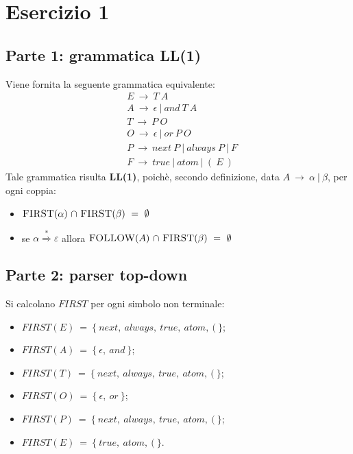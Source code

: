 \documentclass[a4paper,italian]{article}
\begin{document}

\setcounter{page}{1}
\section*{Esercizio 1}
\subsection*{Parte 1: grammatica LL(1)}
Viene fornita la seguente grammatica equivalente:
\begin{equation*}
	\begin{split}
		& E\ \rightarrow\ T\ A\\
		& A\ \rightarrow\ \epsilon\ \vert\ and\ T\ A\\
		& T\ \rightarrow\ P\ O \\
		& O\ \rightarrow\ \epsilon\ \vert\ or\ P\ O\\
		& P\ \rightarrow\ next\ P\ \vert\ always\ P\ \vert\ F\\
		& F\ \rightarrow\ true\ \vert\ atom\ \vert\ (\ E\ )
	\end{split}
\end{equation*}
Tale grammatica risulta \textbf{LL(1)}, poichè, secondo definizione, data $A\ \rightarrow\ \alpha\ \vert\ \beta$, per ogni coppia:
\begin{itemize}
    \item $\mbox{{\sc FIRST}(${\alpha}$)} \ {\cap} \ \mbox{{\sc FIRST}(${\beta}$)} \ = \ \emptyset$
    \item se ${\alpha} \stackrel{\ast}{\Longrightarrow} {\varepsilon}$ allora $\mbox{{\sc FOLLOW}(${A}$)} \ {\cap} \ \mbox{{\sc FIRST}(${\beta}$)} \ = \ \emptyset$
\end{itemize}

\subsection*{Parte 2: parser top-down}
Si calcolano $FIRST$ per ogni simbolo non terminale:
\begin{itemize}
    \item $FIRST(E)\ =\ \{\ next,\ always,\ true,\ atom,\ (\ \}$;
    \item $FIRST(A)\ =\ \{\ \epsilon,\ and\ \}$;
    \item $FIRST(T)\ =\ \{\ next,\ always,\ true,\ atom,\ (\ \}$;
    \item $FIRST(O)\ =\ \{\ \epsilon,\ or\ \}$;
    \item $FIRST(P)\ =\ \{\ next,\ always,\ true,\ atom,\ (\ \}$;
    \item $FIRST(E)\ =\ \{\ true,\ atom,\ (\ \}$.
\end{itemize}
\end{document}
